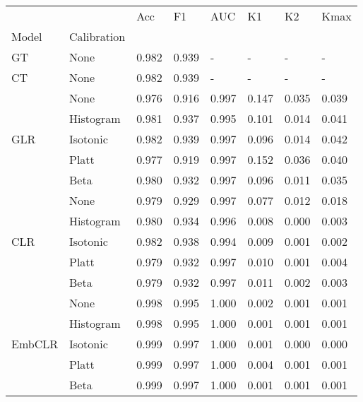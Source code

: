 \begin{tabular}{llllllll}
\toprule
 &  & Acc & F1 & AUC & K1 & K2 & Kmax \\
Model & Calibration &  &  &  &  &  &  \\
\midrule
GT & None & 0.982 & 0.939 & - & - & - & - \\
\cline{1-8}
CT & None & 0.982 & 0.939 & - & - & - & - \\
\cline{1-8}
\multirow[t]{5}{*}{GLR} & None & 0.976 & 0.916 & 0.997 & 0.147 & 0.035 & 0.039 \\
 & Histogram & 0.981 & 0.937 & 0.995 & 0.101 & 0.014 & 0.041 \\
 & Isotonic & 0.982 & 0.939 & 0.997 & 0.096 & 0.014 & 0.042 \\
 & Platt & 0.977 & 0.919 & 0.997 & 0.152 & 0.036 & 0.040 \\
 & Beta & 0.980 & 0.932 & 0.997 & 0.096 & 0.011 & 0.035 \\
\cline{1-8}
\multirow[t]{5}{*}{CLR} & None & 0.979 & 0.929 & 0.997 & 0.077 & 0.012 & 0.018 \\
 & Histogram & 0.980 & 0.934 & 0.996 & 0.008 & 0.000 & 0.003 \\
 & Isotonic & 0.982 & 0.938 & 0.994 & 0.009 & 0.001 & 0.002 \\
 & Platt & 0.979 & 0.932 & 0.997 & 0.010 & 0.001 & 0.004 \\
 & Beta & 0.979 & 0.932 & 0.997 & 0.011 & 0.002 & 0.003 \\
\cline{1-8}
\multirow[t]{5}{*}{EmbCLR} & None & 0.998 & 0.995 & 1.000 & 0.002 & 0.001 & 0.001 \\
 & Histogram & 0.998 & 0.995 & 1.000 & 0.001 & 0.001 & 0.001 \\
 & Isotonic & 0.999 & 0.997 & 1.000 & 0.001 & 0.000 & 0.000 \\
 & Platt & 0.999 & 0.997 & 1.000 & 0.004 & 0.001 & 0.001 \\
 & Beta & 0.999 & 0.997 & 1.000 & 0.001 & 0.001 & 0.001 \\
\cline{1-8}
\bottomrule
\end{tabular}
